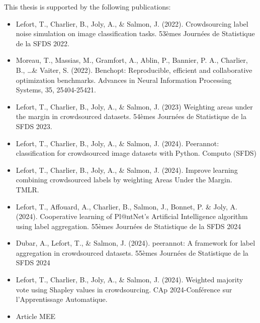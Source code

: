 This thesis is supported by the following publications:
\begin{itemize}
    \item Lefort, T., Charlier, B., Joly, A., \& Salmon, J. (2022). Crowdsourcing label noise simulation on image classification tasks. 53èmes Journées de Statistique de la SFDS 2022.
    \item Moreau, T., Massias, M., Gramfort, A., Ablin, P., Bannier, P. A., Charlier, B., \dots \& Vaiter, S. (2022). Benchopt: Reproducible, efficient and collaborative optimization benchmarks. Advances in Neural Information Processing Systems, 35, 25404-25421.
    \item Lefort, T., Charlier, B., Joly, A., \& Salmon, J. (2023) Weighting areas under the margin in crowdsourced datasets. 54èmes Journées de Statistique de la SFDS 2023.
    \item Lefort, T., Charlier, B., Joly, A., \& Salmon, J. (2024). Peerannot: classification for crowdsourced image datasets with Python. Computo (SFDS)
    \item Lefort, T., Charlier, B., Joly, A., \& Salmon, J. (2024). Improve learning combining crowdsourced labels by weighting Areas Under the Margin. TMLR.
    \item Lefort, T., Affouard, A., Charlier, B., Salmon, J., Bonnet, P. \& Joly, A. (2024). Cooperative learning of Pl@ntNet's Artificial Intelligence algorithm using label aggregation. 55èmes Journées de Statistique de la SFDS 2024
    \item Dubar, A., Lefort, T., \& Salmon, J. (2024). peerannot: A framework for label aggregation in crowdsourced datasets. 55èmes Journées de Statistique de la SFDS 2024
    \item Lefort, T., Charlier, B., Joly, A., \& Salmon, J. (2024). Weighted majority vote using Shapley values in crowdsourcing. CAp 2024-Conférence sur l'Apprentissage Automatique.
    \item Article MEE
\end{itemize}

